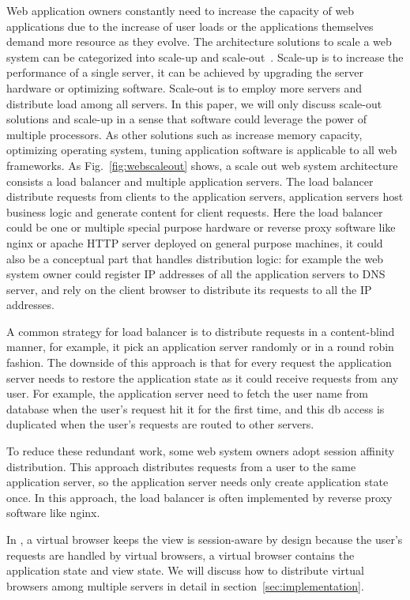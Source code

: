 Web application owners constantly need to increase the capacity of web applications due
to the increase of user loads or the applications themselves demand more resource
as they evolve.
The architecture solutions to scale a web system can be categorized into 
scale-up and scale-out~\cite{cardellini2002state}.
Scale-up is to increase the performance of a single server,
it can be achieved by upgrading the server hardware or optimizing software.
Scale-out is to employ more servers and distribute load among all servers.
In this paper, we will only discuss scale-out solutions and scale-up in
a sense that software could leverage the power of multiple processors.
As other solutions such as increase memory capacity, optimizing operating system,
tuning application software is applicable to all web frameworks.
As Fig.~\ref{fig:webscaleout} shows, 
a scale out web system architecture consists a load balancer and multiple
application servers.
The load balancer distribute requests from clients to the application servers,
application servers host business logic and generate content for client requests.
Here the load balancer could be one or multiple special purpose hardware or reverse 
proxy software like nginx or apache HTTP server deployed on general purpose 
machines, it could also be a conceptual part that handles distribution logic:
for example the web system owner could register IP addresses of all the application
servers to DNS server, and rely on the client browser to distribute its requests to
all the IP addresses.

A common strategy for load balancer is to distribute requests in a content-blind manner,
for example, it pick an application server randomly or in a round robin fashion.
The downside of this approach is that 
for every request the application server needs to restore the application state
as it could receive requests from any user.
For example, the application server need to 
fetch the user name from database when the user's request hit it for the first time,
and this db access is duplicated when the user's requests 
are routed to other servers.

To reduce these redundant work, some web system owners adopt
session affinity distribution.
This approach distributes requests from a user to the same application server,
so the application server needs only create application state once.
In this approach, the load balancer is often implemented by reverse proxy software
like nginx.


In \cb{}, a virtual browser keeps the view 
\cb{} is session-aware by design because 
the user's requests are handled by virtual browsers,
a virtual browser contains the application state and view state.
We will discuss how to distribute virtual browsers among multiple servers
 in detail in section~\ref{sec:implementation}.

